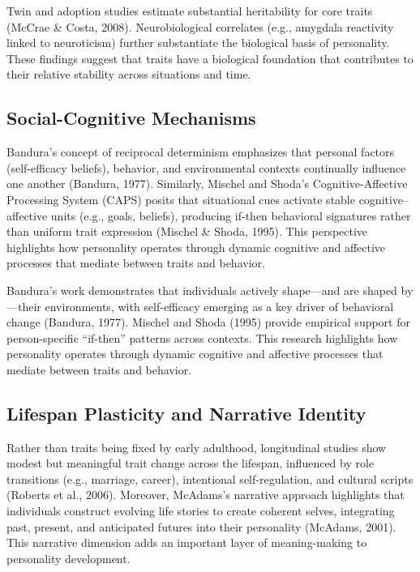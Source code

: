 \documentclass[stu]{apa7}
\begin{document}
Twin and adoption studies estimate substantial heritability for core traits (McCrae \& Costa, 2008). Neurobiological correlates (e.g., amygdala reactivity linked to neuroticism) further substantiate the biological basis of personality. These findings suggest that traits have a biological foundation that contributes to their relative stability across situations and time.

\subsection{Social-Cognitive Mechanisms}

Bandura's concept of reciprocal determinism emphasizes that personal factors (self-efficacy beliefs), behavior, and environmental contexts continually influence one another (Bandura, 1977). %
 Similarly, Mischel and Shoda's Cognitive-Affective Processing System (CAPS) posits that situational cues activate stable cognitive–affective units (e.g., goals, beliefs), producing if-then behavioral signatures rather than uniform trait expression (Mischel \& Shoda, 1995).  %
  This perspective highlights how personality operates through dynamic cognitive and affective processes that mediate between traits and behavior.

Bandura's work demonstrates that individuals actively shape—and are shaped by—their environments, with self-efficacy emerging as a key driver of behavioral change (Bandura, 1977). Mischel and Shoda (1995) provide empirical support for person-specific ``if-then'' patterns across contexts. This research highlights how personality operates through dynamic cognitive and affective processes that mediate between traits and behavior.

\subsection{Lifespan Plasticity and Narrative Identity}

Rather than traits being fixed by early adulthood, longitudinal studies show modest but meaningful trait change across the lifespan, influenced by role transitions (e.g., marriage, career), intentional self-regulation, and cultural scripts (Roberts et al., 2006). Moreover, McAdams's narrative approach highlights that individuals construct evolving life stories to create coherent selves, integrating past, present, and anticipated futures into their personality (McAdams, 2001). This narrative dimension adds an important layer of meaning-making to personality development.
\end{document}
